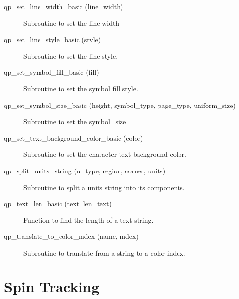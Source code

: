 \begin{description}
\item[qp_set_line_width_basic (line_width)] \Newline 
Subroutine to set the line width.

\item[qp_set_line_style_basic (style)] \Newline 
Subroutine to set the line style.

\item[qp_set_symbol_fill_basic (fill)] \Newline 
Subroutine to set the symbol fill style.

\item[qp_set_symbol_size_basic (height, symbol_type, page_type, uniform_size)] \Newline 
Subroutine to set the symbol_size

\item[qp_set_text_background_color_basic (color)] \Newline 
Subroutine to set the character text background color.

\item[qp_split_units_string (u_type, region, corner, units)] \Newline 
     Subroutine to split a units string into its components.

\item[qp_text_len_basic (text, len_text)] \Newline 
Function to find the length of a text string.

\item[qp_translate_to_color_index (name, index)] \Newline 
     Subroutine to translate from a string to a color index.

\end{description}

\section{Spin Tracking}
\label{r:spin}    

